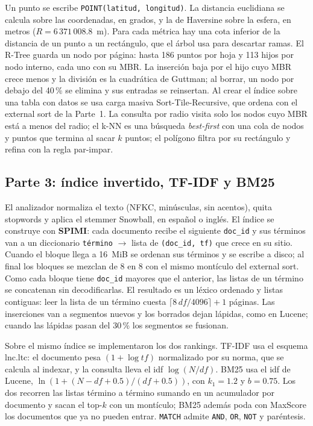 Un punto se escribe \texttt{POINT(latitud, longitud)}. La distancia euclidiana se calcula
sobre las coordenadas, en grados, y la de Haversine sobre la esfera, en metros
($R = 6\,371\,008.8$~m). Para cada métrica hay una cota inferior de la distancia de un
punto a un rectángulo, que el árbol usa para descartar ramas. El R-Tree guarda un nodo por
página: hasta 186 puntos por hoja y 113 hijos por nodo interno, cada uno con su MBR. La
inserción baja por el hijo cuyo MBR crece menos y la división es la cuadrática de Guttman;
al borrar, un nodo por debajo del 40\,\% se elimina y sus entradas se reinsertan. Al crear el
índice sobre una tabla con datos se usa carga masiva Sort-Tile-Recursive, que ordena con el
external sort de la Parte~1. La consulta por radio visita solo los nodos cuyo MBR está a
menos del radio; el k-NN es una búsqueda \emph{best-first} con una cola de nodos y puntos
que termina al sacar $k$ puntos; el polígono filtra por su rectángulo y refina con la regla
par-impar.

\subsection{Parte 3: índice invertido, TF-IDF y BM25}

El analizador normaliza el texto (NFKC, minúsculas, sin acentos), quita stopwords y aplica
el stemmer Snowball, en español o inglés. El índice se construye con \textbf{SPIMI}: cada
documento recibe el siguiente \texttt{doc\_id} y sus términos van a un diccionario
\texttt{término} $\to$ lista de \texttt{(doc\_id, tf)} que crece en su sitio. Cuando el
bloque llega a 16~MiB se ordenan sus términos y se escribe a disco; al final los bloques se
mezclan de 8 en 8 con el mismo montículo del external sort. Como cada bloque tiene
\texttt{doc\_id} mayores que el anterior, las listas de un término se concatenan sin
decodificarlas. El resultado es un léxico ordenado y listas contiguas: leer la lista de un
término cuesta $\lceil 8\,df/4096 \rceil + 1$ páginas. Las inserciones van a segmentos
nuevos y los borrados dejan lápidas, como en Lucene; cuando las lápidas pasan del 30\,\% los
segmentos se fusionan.

Sobre el mismo índice se implementaron los dos rankings. TF-IDF usa el esquema lnc.ltc:
el documento pesa $(1 + \log tf)$ normalizado por su norma, que se calcula al indexar, y la
consulta lleva el idf $\log(N/df)$. BM25 usa el idf de Lucene,
$\ln(1 + (N - df + 0.5)/(df + 0.5))$, con $k_1 = 1.2$ y $b = 0.75$. Los dos recorren las
listas término a término sumando en un acumulador por documento y sacan el top-$k$ con un
montículo; BM25 además poda con MaxScore los documentos que ya no pueden entrar.
\texttt{MATCH} admite \texttt{AND}, \texttt{OR}, \texttt{NOT} y paréntesis.

